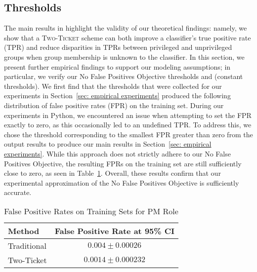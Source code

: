 \subsection{Thresholds}
The main results in  highlight the validity of our theoretical findings: namely, we show that a \textsc{Two-Ticket} scheme can both improve a classifier's true positive rate (TPR) and reduce disparities in TPRs between privileged and unprivileged groups when group membership is unknown to the classifier.
In this section, we present further empirical findings to support our modeling assumptions; in particular, we verify our No False Positives Objective thresholds and  (constant thresholds). 
We first find that the thresholds that were collected for our experiments in Section~\ref{sec: empirical experiments} produced the following distribution of false positive rates (FPR) on the training set. During our experiments in Python, we encountered an issue when attempting to set the FPR exactly to zero, as this occasionally led to an undefined TPR. To address this, we chose the threshold corresponding to the smallest FPR greater than zero from the output results to produce our main results in Section~\ref{sec: empirical experiments}. While this approach does not strictly adhere to our No False Positives Objective, the resulting FPRs on the training set are still sufficiently close to zero, as seen in Table~\ref{tab: FPR for Section 7}. Overall, these results confirm that our experimental approximation of the No False Positives Objective is sufficiently accurate.
\begin{table}[h!]
    \centering
    \begin{tabular}{|l|c|}
        \hline
        \textbf{Method} & \textbf{False Positive Rate at 95\% CI} \\
        \hline
        Traditional     & $0.004 \pm 0.00026$ \\
        Two-Ticket      & $0.0014 \pm 0.000232$ \\
        \hline
    \end{tabular}
    \caption{False Positive Rates on Training Sets for PM Role}
    \label{tab: FPR for Section 7}

\end{table}

